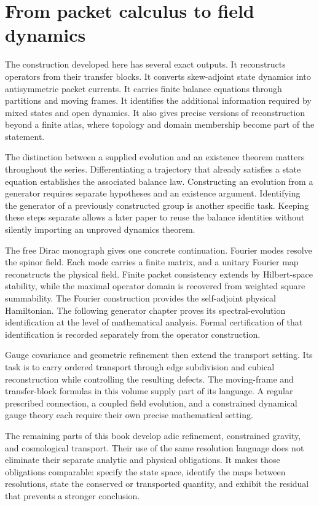 \clearpage
\section{From packet calculus to field dynamics}
The construction developed here has several exact outputs. It reconstructs operators from their transfer blocks. It converts skew-adjoint state dynamics into antisymmetric packet currents. It carries finite balance equations through partitions and moving frames. It identifies the additional information required by mixed states and open dynamics. It also gives precise versions of reconstruction beyond a finite atlas, where topology and domain membership become part of the statement.

The distinction between a supplied evolution and an existence theorem matters throughout the series. Differentiating a trajectory that already satisfies a state equation establishes the associated balance law. Constructing an evolution from a generator requires separate hypotheses and an existence argument. Identifying the generator of a previously constructed group is another specific task. Keeping these steps separate allows a later paper to reuse the balance identities without silently importing an unproved dynamics theorem.

The free Dirac monograph gives one concrete continuation. Fourier modes resolve the spinor field. Each mode carries a finite matrix, and a unitary Fourier map reconstructs the physical field. Finite packet consistency extends by Hilbert-space stability, while the maximal operator domain is recovered from weighted square summability. The Fourier construction provides the self-adjoint physical Hamiltonian. The following generator chapter proves its spectral-evolution identification at the level of mathematical analysis. Formal certification of that identification is recorded separately from the operator construction.

Gauge covariance and geometric refinement then extend the transport setting. Its task is to carry ordered transport through edge subdivision and cubical reconstruction while controlling the resulting defects. The moving-frame and transfer-block formulas in this volume supply part of its language. A regular prescribed connection, a coupled field evolution, and a constrained dynamical gauge theory each require their own precise mathematical setting.

The remaining parts of this book develop adic refinement, constrained gravity, and cosmological transport. Their use of the same resolution language does not eliminate their separate analytic and physical obligations. It makes those obligations comparable: specify the state space, identify the maps between resolutions, state the conserved or transported quantity, and exhibit the residual that prevents a stronger conclusion.


